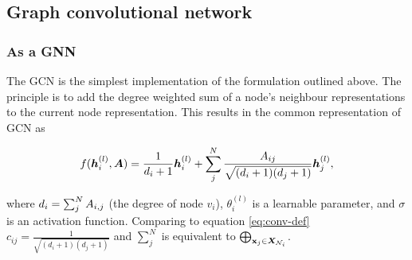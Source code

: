 





\subsection{Graph convolutional network}
\label{sec:GCN}



\subsubsection{As a GNN}

The GCN is the simplest implementation of the formulation outlined above.
The principle is to add the degree weighted sum of a node's neighbour representations to the current node representation.
This results in the common representation of GCN as

\begin{equation}
    \label{eq:GCN-as-GNN}
    f({\bm{h}}_i^{(l)}, {\bm{A}}) = \frac1{d_i + 1}{\bm{h}}_i^{(l)} + \sum_j^N\frac{{A}_{ij}}{\sqrt{(d_i + 1)(d_j + 1)}}{\bm{h}}_j^{(l)},
\end{equation}

where $d_i = \sum_j^N {A}_{i,j}$ (the degree of node $v_i$), $\theta_i^{(l)}$ is a learnable parameter, and $\sigma$ is an activation function. Comparing to equation \ref{eq:conv-def} $c_{ij} = \frac1{\sqrt{(d_i + 1)(d_j + 1)}}$ and $\sum_j^N$ is equivalent to $\bigoplus_{{\textbf{x}}_j \in {\bm{X}}_{{\mathcal{N}}_i}}$. 

